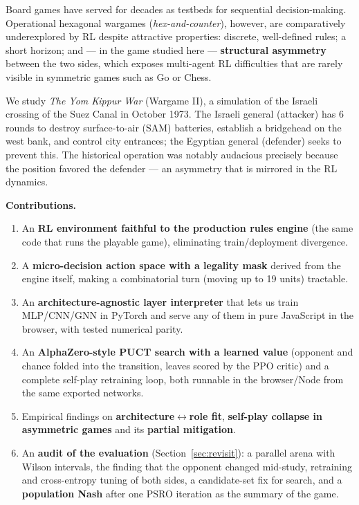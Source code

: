 \documentclass{article}
\begin{document}
Board games have served for decades as testbeds for sequential decision-making.
Operational hexagonal wargames (\emph{hex-and-counter}), however, are comparatively
underexplored by RL despite attractive properties: discrete, well-defined rules; a
short horizon; and --- in the game studied here --- \textbf{structural asymmetry}
between the two sides, which exposes multi-agent RL difficulties that are rarely visible
in symmetric games such as Go or Chess.

We study \emph{The Yom Kippur War} (Wargame II), a simulation of the Israeli crossing of
the Suez Canal in October 1973. The Israeli general (attacker) has 6 rounds to destroy
surface-to-air (SAM) batteries, establish a bridgehead on the west bank, and control
city entrances; the Egyptian general (defender) seeks to prevent this. The historical
operation was notably audacious precisely because the position favored the defender ---
an asymmetry that is mirrored in the RL dynamics.

\textbf{Contributions.}
\begin{enumerate}[leftmargin=1.4em,itemsep=2pt]
  \item An \textbf{RL environment faithful to the production rules engine} (the same
  code that runs the playable game), eliminating train/deployment divergence.
  \item A \textbf{micro-decision action space with a legality mask} derived from the
  engine itself, making a combinatorial turn (moving up to 19 units) tractable.
  \item An \textbf{architecture-agnostic layer interpreter} that lets us train MLP/CNN/GNN
  in PyTorch and serve any of them in pure JavaScript in the browser, with tested
  numerical parity.
  \item An \textbf{AlphaZero-style PUCT search with a learned value} (opponent and chance
  folded into the transition, leaves scored by the PPO critic) and a complete self-play
  retraining loop, both runnable in the browser/Node from the same exported networks.
  \item Empirical findings on \textbf{architecture$\leftrightarrow$role fit},
  \textbf{self-play collapse in asymmetric games} and its \textbf{partial mitigation}.
  \item An \textbf{audit of the evaluation} (Section~\ref{sec:revisit}): a parallel arena
  with Wilson intervals, the finding that the opponent changed mid-study, retraining and
  cross-entropy tuning of both sides, a candidate-set fix for search, and a
  \textbf{population Nash} after one PSRO iteration as the summary of the game.
\end{enumerate}
\end{document}
